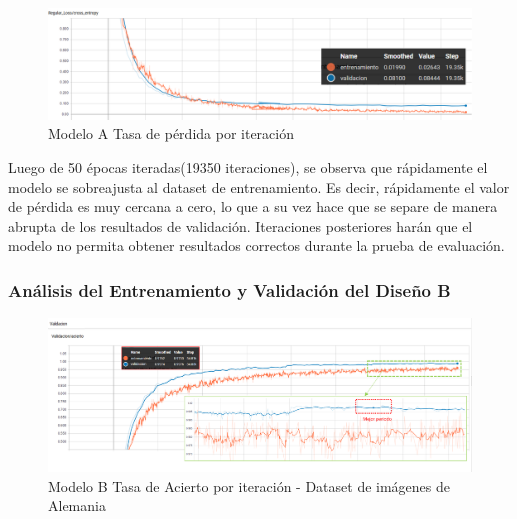 			\begin{figure}[H]
				\begin{center}
				\includegraphics[width=1\textwidth]{images/desarrollo/trainResults/model0Loss} 
				\end{center}
				\begin{center}
				\caption{\small{Modelo A Tasa de pérdida por iteración}}
				\vspace{-1em}
				{\small{\fontsize{10}{16.8}\selectfont {Fuente propia}}}
				\end{center}
				\vspace{-1.5em}
			\end{figure}

			Luego de 50 épocas iteradas(19350 iteraciones), se observa que rápidamente el modelo se sobreajusta al dataset de entrenamiento. Es decir, rápidamente el valor de pérdida es muy cercana a cero, lo que a su vez hace que se separe de manera abrupta de los resultados de validación. Iteraciones posteriores harán que el modelo no permita obtener resultados correctos durante la prueba de evaluación.


		\subsubsection{Análisis del Entrenamiento y Validación del Diseño B}  
		
			\begin{figure}[H]
				\begin{center}
				\includegraphics[width=1\textwidth]{images/desarrollo/trainResults/model1Acierto} 
				\end{center}
				\begin{center}
				\caption{\small{Modelo B Tasa de Acierto por iteración - Dataset de imágenes de Alemania  }}
				\vspace{-1em}
				{\small{\fontsize{10}{16.8}\selectfont {Fuente propia}}}
				\end{center}
				\vspace{-1.5em}
			\end{figure}
		
